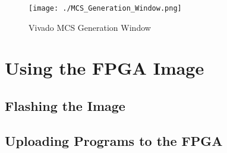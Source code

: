 	\begin{figure}[h!tbp]
		\centering
		\texttt{[image: ./MCS\_Generation\_Window.png]}
		\caption{Vivado MCS Generation Window}
		\label{fig:Vivado_MCS_Window}
	\end{figure}
	

\section{Using the FPGA Image}\label{sec:Using_FPGA_Image}
\subsection{Flashing the Image}\label{sec:Flash_FPGA_Image}
\subsection{Uploading Programs to the FPGA}\label{sec:Upload_Programs_to_Flashed_FPGA}
